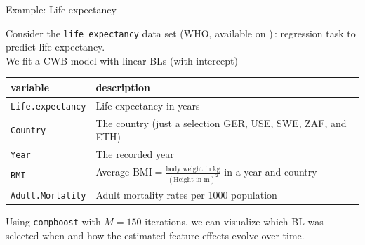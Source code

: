 \documentclass[11pt,compress,t,notes=noshow, xcolor=table]{beamer}
\begin{document}
\begin{framev}{Example: Life expectancy}

Consider the \texttt{life expectancy} data set (WHO, available on )\,: regression task to predict life expectancy. \\
\vspace{0.1cm}
We fit a CWB model with linear BLs (with intercept) 

\begin{table}
\scriptsize
\begin{tabular}{l|l}
    \textbf{variable} & \textbf{description} \\
    \hline
    \texttt{Life.expectancy} & Life expectancy in years \\	
    \hline
    \texttt{Country}         & The country (just a selection GER, USE, SWE, ZAF, and ETH)\\
    \texttt{Year}            & The recorded year\\
    \texttt{BMI}             & Average $\text{BMI} = \frac{\text{body weight in kg}}{(\text{Height in m})^2}$ in a year and country\\
    \texttt{Adult.Mortality} & Adult mortality rates %
                             per 1000 population
\end{tabular}
\end{table}
\vspace{0.4cm}
Using \texttt{compboost} with $M = 150$ iterations, we can visualize which BL was selected when and how the estimated feature effects evolve over time.
\end{framev}



{}
\end{document}
